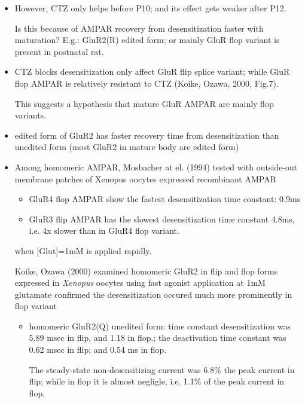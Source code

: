 \begin{itemize}
  
  \item However, CTZ only helps before P10; and its effect gets weaker after
  P12.

Is this because of AMPAR recovery from desensitization faster with maturation?
E.g.: GluR2(R) edited form; or mainly GluR flop variant is present in postnatal
rat.

  \item CTZ blocks desensitization only affect GluR flip splice variant; while
  GluR flop AMPAR is relatively resistant to CTZ (Koike, Ozawa, 2000, Fig.7).
  
  This suggests a hypothesis that mature GluR AMPAR are mainly flop variants.
  
  \item edited form of GluR2 has faster recovery time from desensitization than
  unedited form (most GluR2 in mature body are edited form)
    
  \item Among homomeric AMPAR, Mosbacher at el. (1994) tested with outside-out
  membrane patches of Xenopus oocytes expressed recombinant AMPAR
   
  \begin{itemize}
    \item GluR4 flop AMPAR show the fastest desensitization time constant: 0.9ms 
  
    \item GluR3 flip AMPAR has the slowest desensitization time constant 4.8ms,
    i.e. 4x slower than in GluR4 flop variant.
  
  \end{itemize}
  when [Glut]=1mM is applied rapidly.
  
  Koike, Ozawa (2000) examined homomeric GluR2 in flip and flop forms expressed
  in {\it Xenopus} oocytes using fast agonist application at 1mM glutamate
  confirmed the desensitization occured much more prominently in flop variant
  
  \begin{itemize}
    \item homomeric GluR2(Q) unedited form: time constant desensitization was
    5.89 msec in flip, and 1.18 in flop.; the deactivation time constant was 0.62 msec in
    flip; and 0.54 ms in flop. 
    
    The steady-state non-desensitizing current was 6.8\% the peak current in
    flip; while in flop it is almost negligle, i.e. 1.1\% of the peak current
    in flop.
         

\end{itemize}
\end{itemize}
